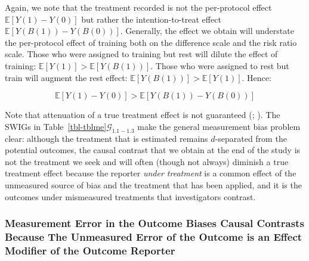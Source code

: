 \documentclass[
  single column]{article}
\begin{document}
Again, we note that the treatment recorded is not the per-protocol
effect \(\mathbb{E}[Y(1) - Y(0)]\) but rather the intention-to-treat
effect \(\mathbb{E}[Y(B(1)) - Y(B(0))]\). Generally, the effect we
obtain will understate the per-protocol effect of training both on the
difference scale and the risk ratio scale. Those who were assigned to
training but rest will dilute the effect of training:
\(\mathbb{E}[Y(1)] > \mathbb{E}[Y(B(1))]\). Those who were assigned to
rest but train will augment the rest effect:
\(\mathbb{E}[Y(B(1))] > \mathbb{E}[Y(1)]\). Hence:

\[
 \mathbb{E}[Y(1) - Y(0)] > \mathbb{E}[Y(B(1)) - Y(B(0))]
\]

Note that attenuation of a true treatment effect is not guaranteed
(;
). The SWIGs in
Table~\ref{tbl-tblme}\(\mathcal{G}_{1.1-1.3}\) make the general
measurement bias problem clear: although the treatment that is estimated
remains \(d\)-separated from the potential outcomes, the causal contrast
that we obtain at the end of the study is not the treatment we seek and
will often (though not always) diminish a true treatment effect because
the reporter \emph{under treatment} is a common effect of the unmeasured
source of bias and the treatment that has been applied, and it is the
outcomes under mismeasured treatments that investigators contrast.

\subsubsection{Measurement Error in the Outcome Biases Causal Contrasts
Because The Unmeasured Error of the Outcome is an Effect Modifier of the
Outcome
Reporter}\label{measurement-error-in-the-outcome-biases-causal-contrasts-because-the-unmeasured-error-of-the-outcome-is-an-effect-modifier-of-the-outcome-reporter}
\end{document}
